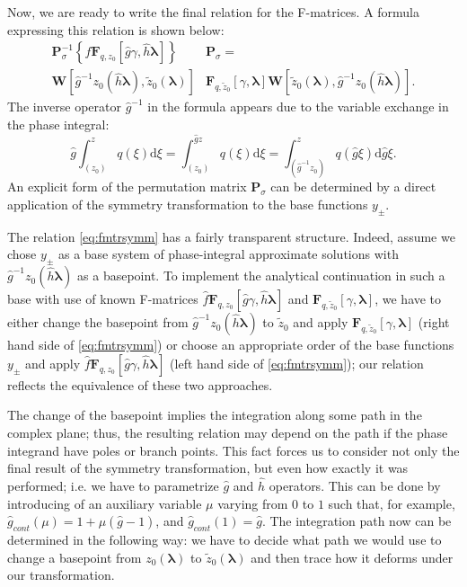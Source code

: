 \documentclass[atmp]{ipart_v1}
\def\rmd{\mathrm{d}}
\def\lmbd{\bm{\lambda}}
\def\f{\hat{f}}
\def\g{\hat{g}}
\def\h{\hat{h}}
\def\P{\bm{P}_\sigma}
\def\F{\bm{F}}
\def\W{\bm{W}}
\def\unity{1}
\newcommand\eref[1]{\eqref{#1}}
\begin{document}
Now, we are ready to write the final relation for the F-matrices. A formula
expressing this relation is shown below:
\begin{equation}
\begin{split}
\P^{-1} \left\{ \f \F_{q,z_0} \left[\g \gamma, \h \lmbd \right] \right\} &\P=
 \\
   \W \left[ \g^{-1} z_0(\h\lmbd), \tilde{z}_0(\lmbd) \right]&
   \F_{q,\tilde{z}_0} \left[ \gamma, \lmbd \right]
   \W \left[ \tilde{z}_0(\lmbd), \g^{-1} z_0(\h\lmbd) \right].
\end{split}
\label{eq:fmtrsymm}
\end{equation}
The inverse operator $\g^{-1}$ in the formula appears due to the variable exchange in the phase integral:
\begin{equation}
\g \int_{(z_0)}^z q(\xi) \rmd \xi = \int_{(z_0)}^{\g z} q(\xi) \rmd \xi 
= \int_{(\g^{-1}z_0)}^{z} q(\g\xi) \rmd \g\xi.
\end{equation}
An explicit form of the permutation matrix $\P$ can be determined by a direct application of the symmetry 
transformation to the base functions $y_\pm$.

The relation \eref{eq:fmtrsymm} has a fairly transparent structure. Indeed, assume we chose $y_\pm$ 
as a base system of phase-integral approximate solutions with $\g^{-1} z_0(\h\lmbd)$ as a basepoint. 
To implement the analytical continuation in such a base with use of known F-matrices 
$\f\F_{q,z_0}[\g\gamma,\h\lmbd]$ and $\F_{q,\tilde{z}_0}[\gamma,\lmbd]$, 
we have to either change the basepoint from $\g^{-1} z_0(\h\lmbd)$ to $\tilde{z}_0$ and apply
$\F_{q,\tilde{z}_0}[\gamma,\lmbd]$ (right hand side of \eref{eq:fmtrsymm}) 
or choose an appropriate order of the base functions $y_\pm$ and apply $\f\F_{q,z_0}[\g\gamma,\h\lmbd]$
(left hand side of \eref{eq:fmtrsymm}); our relation reflects the equivalence of these two approaches.

The change of the basepoint implies the integration along some path in the complex plane;
thus, the resulting relation may depend on the path if the phase integrand have poles
or branch points. This fact forces us to consider not only the final result of the 
symmetry transformation, but even how exactly it was performed; i.e. we have to parametrize
$\g$ and $\h$ operators. This can be done by introducing of an auxiliary variable $\mu$ varying 
from $0$ to $1$ such that, for example, $\g_{cont}(\mu)=\unity+\mu (\g-\unity)$, and $\g_{cont}(1)=\g$. 
The integration path now can be determined in the following way: we have to decide what path 
we would use to change a basepoint from $z_0(\lmbd)$ to $\tilde{z}_0(\lmbd)$ and then trace how 
it deforms under our transformation. 
\end{document}
